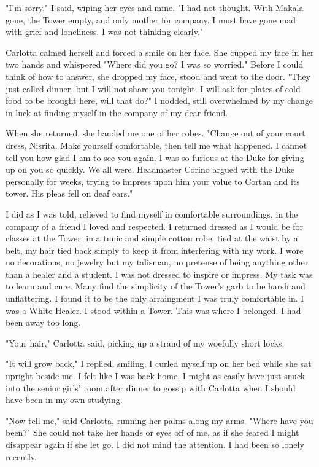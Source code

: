 \documentclass{article}
\begin{document}
"I'm sorry," I said, wiping her eyes and mine. "I had not thought. With Makala gone, the Tower empty, and only mother for company, I must have gone mad with grief and loneliness. I was not thinking clearly."

Carlotta calmed herself and forced a smile on her face. She cupped my face in her two hands and whispered "Where did you go? I was so worried." Before I could think of how to answer, she dropped my face, stood and went to the door. "They just called dinner, but I will not share you tonight. I will ask for plates of cold food to be brought here, will that do?" I nodded, still overwhelmed by my change in luck at finding myself in the company of my dear friend. 

When she returned, she handed me one of her robes. "Change out of your court dress, Nisrita. Make yourself comfortable, then tell me what happened. I cannot tell you how glad I am to see you again. I was so furious at the Duke for giving up on you so quickly. We all were. Headmaster Corino argued with the Duke personally for weeks, trying to impress upon him your value to Cortan and its tower. His pleas fell on deaf ears."

I did as I was told, relieved to find myself in comfortable surroundings, in the company of a friend I loved and respected. I returned dressed as I would be for classes at the Tower: in a tunic and simple cotton robe, tied at the waist by a belt, my hair tied back simply to keep it from interfering with my work. I wore no decorations, no jewelry but my talisman, no pretense of being anything other than a healer and a student. I was not dressed to inspire or impress. My task was to learn and cure. Many find the simplicity of the Tower's garb to be harsh and unflattering. I found it to be the only arraingment I was truly comfortable in. I was a White Healer. I stood within a Tower. This was where I belonged. I had been away too long.

"Your hair," Carlotta said, picking up a strand of my woefully short locks. 

"It will grow back," I replied, smiling. I curled myself up on her bed while she sat upright beside me. I felt like I was back home. I might as easily have  just snuck into the senior girls' room after dinner to gossip with Carlotta when I should have been in my own studying. 

"Now tell me," said Carlotta, running her palms along my arms. "Where have you been?" She could not take her hands or eyes off of me, as if she feared I might disappear again if she let go. I did not mind the attention. I had been so lonely recently.
\end{document}
